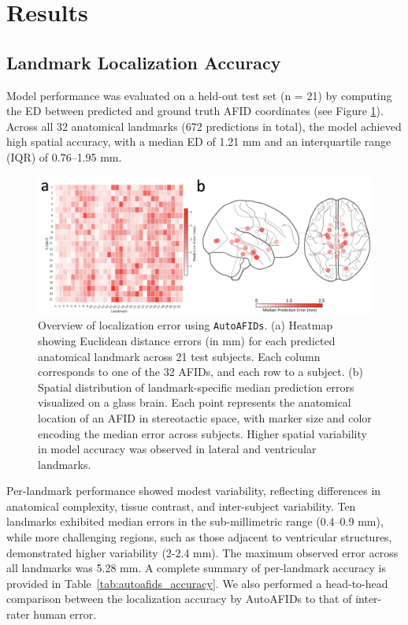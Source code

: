 \section{Results}
\subsection{Landmark Localization Accuracy}
Model performance was evaluated on a held-out test set (n = 21) by computing the ED between predicted and ground truth AFID coordinates (see Figure \ref{fig:ch3_Figure_autoscore}). Across all 32 anatomical landmarks (672 predictions in total), the model achieved high spatial accuracy, with a median ED of 1.21 mm and an interquartile range (IQR) of 0.76–1.95 mm. 

\begin{figure}[hbt!]
    \centering
    \includegraphics[width=1\linewidth]{figs/reds_final.png}
    \caption{Overview of localization error using \texttt{AutoAFIDs}. (a) Heatmap showing Euclidean distance errors (in mm) for each predicted anatomical landmark across 21 test subjects. Each column corresponds to one of the 32 AFIDs, and each row to a subject. (b) Spatial distribution of landmark-specific median prediction errors visualized on a glass brain. Each point represents the anatomical location of an AFID in stereotactic space, with marker size and color encoding the median error across subjects. Higher spatial variability in model accuracy was observed in lateral and ventricular landmarks.}
    \label{fig:ch3_Figure_autoscore}
\end{figure}

Per-landmark performance showed modest variability, reflecting differences in anatomical complexity, tissue contrast, and inter-subject variability. Ten landmarks exhibited median errors in the sub-millimetric range (0.4–0.9 mm), while more challenging regions, such as those adjacent to ventricular structures, demonstrated higher variability (2-2.4 mm). The maximum observed error across all landmarks was 5.28 mm. A complete summary of per-landmark accuracy is provided in Table~\ref{tab:autoafids_accuracy}. We also performed a head-to-head comparison between the localization accuracy by AutoAFIDs to that of inter-rater human error.


